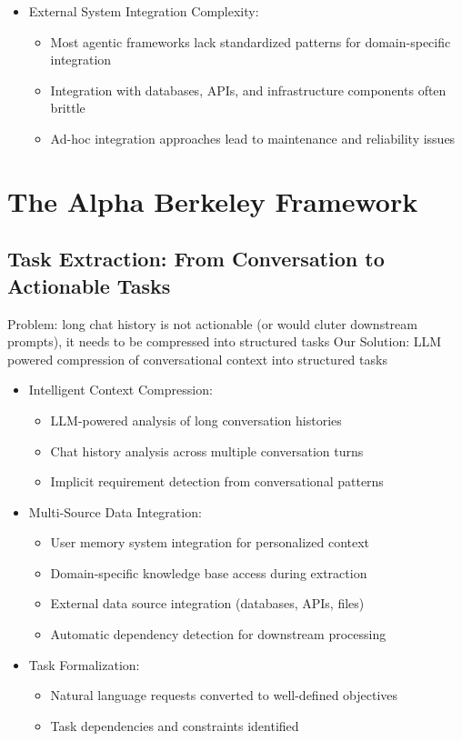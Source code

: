 \begin{itemize}
    \item External System Integration Complexity:
    \begin{itemize}
        \item Most agentic frameworks lack standardized patterns for domain-specific integration
        \item Integration with databases, APIs, and infrastructure components often brittle
        \item Ad-hoc integration approaches lead to maintenance and reliability issues
    \end{itemize}
\end{itemize}


\section{The Alpha Berkeley Framework}
\label{sec:framework}

\subsection{Task Extraction: From Conversation to Actionable Tasks}
\label{sec:task-extraction}
Problem: long chat history is not actionable (or would cluter downstream prompts), it needs to be compressed into structured tasks
Our Solution: LLM powered compression of conversational context into structured tasks
\begin{itemize}
    \item Intelligent Context Compression:
    \begin{itemize}
        \item LLM-powered analysis of long conversation histories
        \item Chat history analysis across multiple conversation turns
        \item Implicit requirement detection from conversational patterns
    \end{itemize}
    \item Multi-Source Data Integration:
    \begin{itemize}
        \item User memory system integration for personalized context
        \item Domain-specific knowledge base access during extraction
        \item External data source integration (databases, APIs, files)
        \item Automatic dependency detection for downstream processing
    \end{itemize}
    \item Task Formalization:
    \begin{itemize}
        \item Natural language requests converted to well-defined objectives
        \item Task dependencies and constraints identified
    \end{itemize}
\end{itemize}


